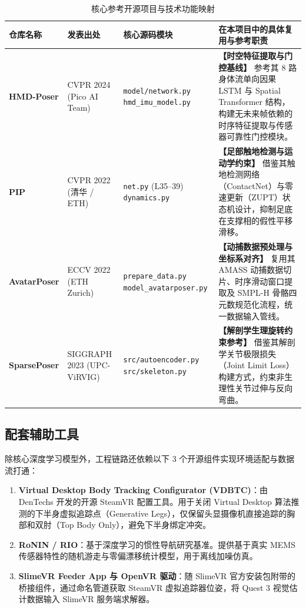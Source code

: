 \documentclass[UTF8,11pt,a4paper]{ctexart}
\begin{document}
\begin{table}[H]
\centering
\small
\caption{核心参考开源项目与技术功能映射}
\label{tab:repos}
\begin{tabular}{>{\raggedright\arraybackslash}p{2.2cm}>{\raggedright\arraybackslash}p{2.2cm}p{4.0cm}p{5.8cm}}
\toprule
\textbf{仓库名称} & \textbf{发表出处} & \textbf{核心源码模块} & \textbf{在本项目中的具体复用与参考职责} \\
\midrule
\textbf{HMD-Poser} & CVPR 2024 \newline (Pico AI Team) & \texttt{model/network.py} \newline \texttt{hmd\_imu\_model.py} & \textbf{【时空特征提取与门控基线】} 参考其 8 路身体流单向因果 LSTM 与 Spatial Transformer 结构，构建无未来帧依赖的时序特征提取与传感器可靠性门控模块。 \\
\midrule
\textbf{PIP} & CVPR 2022 \newline (清华 / ETH) & \texttt{net.py} (L35--39) \newline \texttt{dynamics.py} & \textbf{【足部触地检测与运动学约束】} 借鉴其触地检测网络（ContactNet）与零速更新（ZUPT）状态机设计，抑制足底在支撑相的假性平移滑移。 \\
\midrule
\textbf{AvatarPoser} & ECCV 2022 \newline (ETH Zurich) & \texttt{prepare\_data.py} \newline \texttt{model\_avatarposer.py} & \textbf{【动捕数据预处理与坐标系对齐】} 复用其 AMASS 动捕数据切片、时序滑动窗口提取及 SMPL-H 骨骼四元数规范化流程，统一数据输入管线。 \\
\midrule
\textbf{SparsePoser} & SIGGRAPH 2023 \newline (UPC-ViRVIG) & \texttt{src/autoencoder.py} \newline \texttt{src/skeleton.py} & \textbf{【解剖学生理旋转约束参考】} 借鉴其解剖学关节极限损失（Joint Limit Loss）构建方式，约束非生理性关节过伸与反向弯曲。 \\
\bottomrule
\end{tabular}
\end{table}

\subsection{配套辅助工具}

除核心深度学习模型外，工程链路还依赖以下 3 个开源组件实现环境适配与数据流打通：
\begin{enumerate}
    \item \textbf{Virtual Desktop Body Tracking Configurator (VDBTC)}：由 DenTechs 开发的开源 SteamVR 配置工具。用于关闭 Virtual Desktop 算法推测的下半身虚拟追踪点（Generative Legs），仅保留头显摄像机直接追踪的胸部和双肘（Top Body Only），避免下半身绑定冲突。
    \item \textbf{RoNIN / RIO}：基于深度学习的惯性导航研究基准。提供基于真实 MEMS 传感器特性的随机游走与零偏漂移统计模型，用于离线加噪仿真。
    \item \textbf{SlimeVR Feeder App 与 OpenVR 驱动}：随 SlimeVR 官方安装包附带的桥接组件，通过命名管道获取 SteamVR 虚拟追踪器位姿，将 Quest 3 视觉估计数据输入 SlimeVR 服务端求解器。
\end{enumerate}
\end{document}
